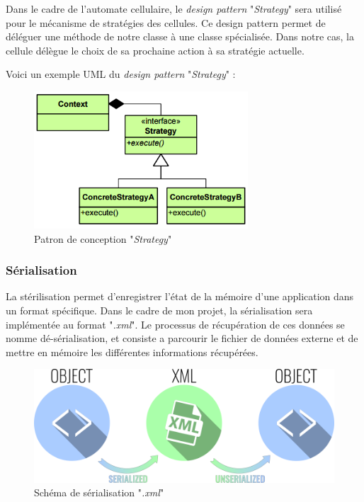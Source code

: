 \documentclass[a4paper, french]{article}
\begin{document}
Dans le cadre de l'automate cellulaire, le \textit{design pattern} "\textit{Strategy}" sera utilisé pour le mécanisme de stratégies des cellules. Ce design pattern permet de déléguer une méthode de notre classe à une classe spécialisée. Dans notre cas, la cellule délègue le choix de sa prochaine action à sa stratégie actuelle.

Voici un exemple UML du \textit{design pattern} "\textit{Strategy}" :

\begin{figure}[htp]
    \centering
    \includegraphics[width=8cm]{strategy.png}
    \caption{Patron de conception "\textit{Strategy}"}
\end{figure}

\subsubsection{Sérialisation}
La stérilisation permet d'enregistrer l'état de la mémoire d'une application dans un format spécifique. Dans le cadre de mon projet, la sérialisation sera implémentée au format "\textit{.xml}". Le processus de récupération de ces données se nomme dé-sérialisation, et consiste a parcourir le fichier de données externe et de mettre en mémoire les différentes informations récupérées.

\vfill
\begin{figure}[htp]
    \centering
    \includegraphics[width=\linewidth - 2cm]{serialization.png}
    \caption{Schéma de sérialisation "\textit{.xml}"}
\end{figure}
\vfill
\end{document}
